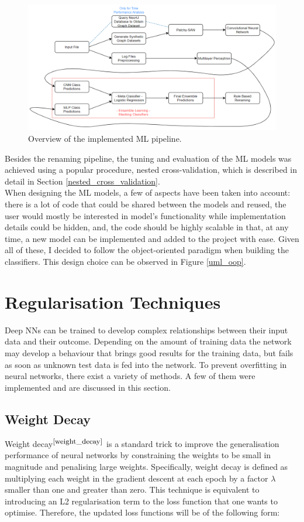 \begin{figure}[H]
  \centering
  \centerline{\includegraphics[scale = 0.5]{Images/pipeline.png}}
  \caption{Overview of the implemented ML pipeline.}
  \label{pipeline}
\end{figure}

Besides the renaming pipeline, the tuning and evaluation of the ML models was achieved using a popular procedure, nested cross-validation, which is described in detail in Section \ref{nested_cross_validation}. \\

When designing the ML models, a few of aspects have been taken into account: there is a lot of code that could be shared between the models and reused, the user would mostly be interested in model's functionality while implementation details could be hidden, and, the code should be highly scalable in that, at any time, a new model can be implemented and added to the project with ease. Given all of these, I decided to follow the object-oriented paradigm when building the classifiers. This design choice can be observed in Figure \ref{uml_oop}.

\section{Regularisation Techniques}

Deep NNs can be trained to develop complex relationships between their input data and their outcome. Depending on the amount of training data the network may develop a behaviour that brings good results for the training data, but fails as soon as unknown test data is fed into the network. To prevent overfitting in neural networks, there exist a variety of methods. A few of them were implemented and are discussed in this section.

\subsection{Weight Decay}
Weight decay$^{\small \cite{weight_decay}}$ is a standard trick to improve the generalisation performance of neural
networks by constraining the weights to be small in magnitude and penalising large weights. Specifically, weight decay is defined as multiplying each weight in the gradient descent at each epoch by a factor $\lambda$ smaller than one and greater than zero. This technique is equivalent to introducing an L2 regularisation term to the loss function that one wants to optimise. Therefore, the updated loss functions will be of the following form: 

